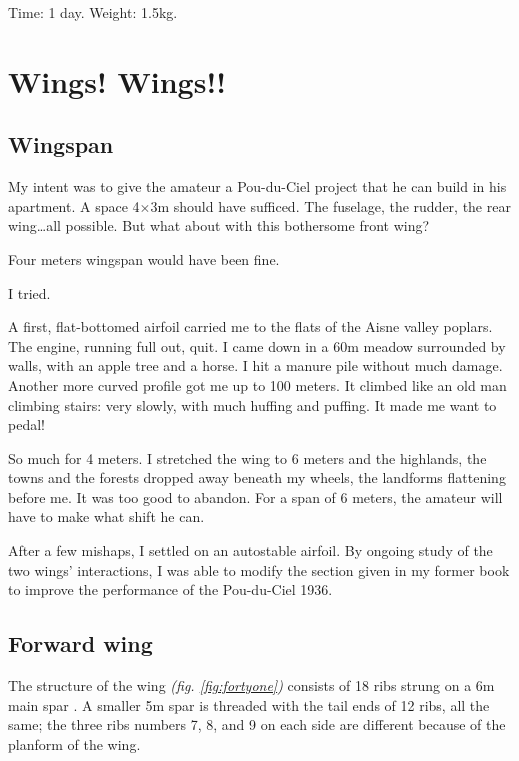 \documentclass{book}
\newcommand*\circled[1]{\tikz[baseline=(char.base)]{
    \node[shape=circle,draw,inner sep=1pt] (char) {#1};}}
\begin{document}
Time: 1 day.  Weight: 1.5kg.

\chapter{Wings! Wings!!}

\section{Wingspan}

My intent was to give the amateur a Pou-du-Ciel project that he can
build in his apartment.  A space 4$\times$3m should have sufficed.
The fuselage, the rudder, the rear wing\ldots all possible.  But what
about with this bothersome front wing?

Four meters wingspan would have been fine.

I tried.

A first, flat-bottomed airfoil carried me to the flats of the Aisne
valley poplars.  The engine, running full out, quit.  I came down in a
60m meadow surrounded by walls, with an apple tree and a horse.  I hit
a manure pile without much damage.  Another more curved profile got me
up to 100 meters.  It climbed like an old man climbing stairs: very
slowly, with much huffing and puffing.  It made me want to pedal!

So much for 4 meters.  I stretched the wing to 6 meters and the
highlands, the towns and the forests dropped away beneath my wheels,
the landforms flattening before me.  It was too good to abandon.  For
a span of 6 meters, the amateur will have to make what shift he can.

After a few mishaps, I settled on an autostable airfoil.  By ongoing
study of the two wings' interactions, I was able to modify the section
given in my former book to improve the performance of the Pou-du-Ciel
1936.

\section{Forward wing}

The structure of the wing \textit{(fig. \ref{fig:fortyone})} consists
of 18 ribs strung on a 6m main spar \circled{200}.  A smaller 5m spar
\circled{201} is threaded with the tail ends of 12 ribs, all the same;
the three ribs numbers 7, 8, and 9 on each side are different because
of the planform of the wing.
\end{document}
